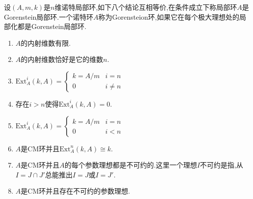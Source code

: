 设$(A,m,k)$是$n$维诺特局部环,如下八个结论互相等价,在条件成立下称局部环$A$是Gorenstein局部环.一个诺特环$A$称为Gorensteion环,如果它在每个极大理想处的局部化都是Gorenstein局部环.
\begin{enumerate}
	\item $A$的内射维数有限.
	\item $A$的内射维数恰好是它的维数$n$.
	\item $\mathrm{Ext}_A^i(k,A)=\left\{\begin{array}{cc}k=A/m&i=n\\0&i\not=n\end{array}\right.$
	\item 存在$i>n$使得$\mathrm{Ext}_A^i(k,A)=0$.
	\item $\mathrm{Ext}_A^i(k,A)=\left\{\begin{array}{cc}k=A/m&i=n\\0&i<n\end{array}\right.$
	\item $A$是CM环并且$\mathrm{Ext}_A^n(k,A)\cong k$.
	\item $A$是CM环并且$A$的每个参数理想都是不可约的.这里一个理想$I$不可约是指,从$I=J\cap J'$总能推出$I=J$或$I=J'$.
	\item $A$是CM环并且存在不可约的参数理想.
\end{enumerate}
